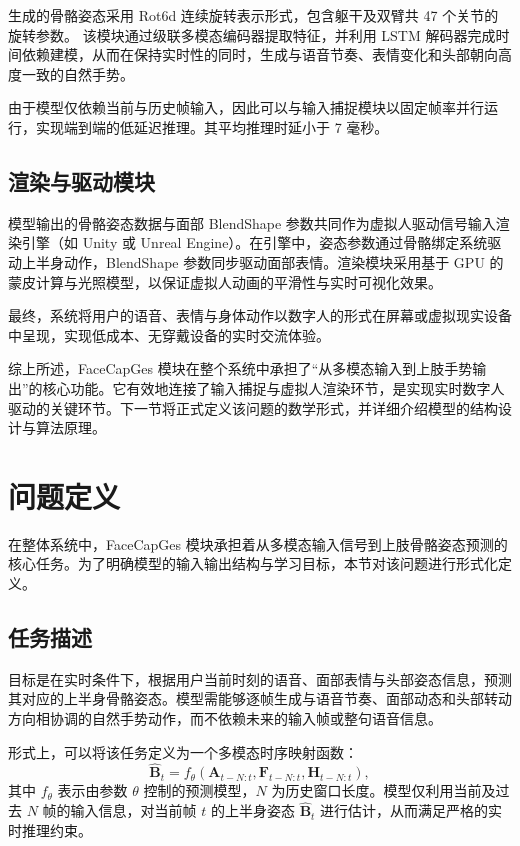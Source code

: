 生成的骨骼姿态采用 Rot6d 连续旋转表示形式，包含躯干及双臂共 47 个关节的旋转参数。
该模块通过级联多模态编码器提取特征，并利用 LSTM 解码器完成时间依赖建模，从而在保持实时性的同时，生成与语音节奏、表情变化和头部朝向高度一致的自然手势。

由于模型仅依赖当前与历史帧输入，因此可以与输入捕捉模块以固定帧率并行运行，实现端到端的低延迟推理。其平均推理时延小于 7 毫秒。

\subsection{渲染与驱动模块}

模型输出的骨骼姿态数据与面部 BlendShape 参数共同作为虚拟人驱动信号输入渲染引擎（如 Unity 或 Unreal Engine）。在引擎中，姿态参数通过骨骼绑定系统驱动上半身动作，BlendShape 参数同步驱动面部表情。渲染模块采用基于 GPU 的蒙皮计算与光照模型，以保证虚拟人动画的平滑性与实时可视化效果。

最终，系统将用户的语音、表情与身体动作以数字人的形式在屏幕或虚拟现实设备中呈现，实现低成本、无穿戴设备的实时交流体验。

综上所述，FaceCapGes 模块在整个系统中承担了“从多模态输入到上肢手势输出”的核心功能。它有效地连接了输入捕捉与虚拟人渲染环节，是实现实时数字人驱动的关键环节。下一节将正式定义该问题的数学形式，并详细介绍模型的结构设计与算法原理。

\section{问题定义}

在整体系统中，FaceCapGes 模块承担着从多模态输入信号到上肢骨骼姿态预测的核心任务。为了明确模型的输入输出结构与学习目标，本节对该问题进行形式化定义。

\subsection{任务描述}

目标是在实时条件下，根据用户当前时刻的语音、面部表情与头部姿态信息，预测其对应的上半身骨骼姿态。模型需能够逐帧生成与语音节奏、面部动态和头部转动方向相协调的自然手势动作，而不依赖未来的输入帧或整句语音信息。

形式上，可以将该任务定义为一个多模态时序映射函数：
\begin{equation}
\hat{\mathbf{B}}_t = f_\theta(\mathbf{A}_{t-N:t}, \mathbf{F}_{t-N:t}, \mathbf{H}_{t-N:t}),
\end{equation}
其中 $f_\theta$ 表示由参数 $\theta$ 控制的预测模型，$N$ 为历史窗口长度。模型仅利用当前及过去 $N$ 帧的输入信息，对当前帧 $t$ 的上半身姿态 $\hat{\mathbf{B}}_t$ 进行估计，从而满足严格的实时推理约束。

